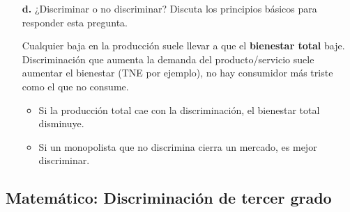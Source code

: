 \documentclass{exam}
\begin{document}
\begin{itemize}
\begin{solution}
    \end{solution}
    \item[\textbf{d.}] ¿Discriminar o no discriminar? Discuta los principios básicos para responder esta pregunta.
    \begin{solution}
    Cualquier baja en la producción suele llevar a que el \textbf{bienestar total} baje. Discriminación que aumenta la demanda del producto/servicio suele aumentar el bienestar (TNE por ejemplo), no hay consumidor más triste como el que no consume. 
        \begin{itemize}
            \item Si la producción total cae con la discriminación, el bienestar total disminuye.
            \item Si un monopolista que no discrimina cierra un mercado, es mejor discriminar.
        \end{itemize}
    \end{solution}
    \end{itemize}

\subsection{Matemático: Discriminación de tercer grado}
\end{document}
